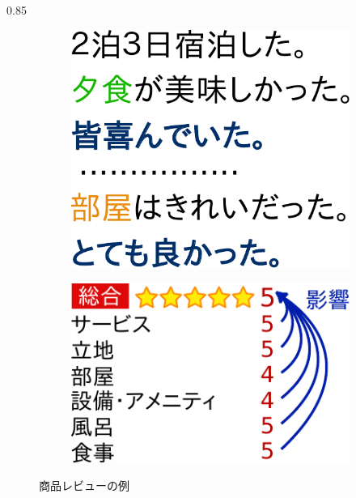 \documentclass[unicode,10pt]{beamer}
\newlength{\mycolumnwidth}
\begin{document}
\begin{frame}[t]
\begin{columns}[onlytextwidth,t]
\begin{column}{0.85\mycolumnwidth}
  \begin{figure}
    \hspace*{\fill} %
    \begin{subfigure}[t]{0.38\linewidth}
      \includegraphics[width=0.9\linewidth]
                      {fig/relations_among_sentences_v3.pdf}
    \end{subfigure}
    \hfill %
    \begin{subfigure}[t]{0.52\linewidth}
      \includegraphics[width=0.9\linewidth]
                      {fig/relations_among_rating_categories.pdf}
    \end{subfigure}
    \hspace*{\fill} %
    \caption*{商品レビューの例}
  \end{figure}


\end{column}
\end{columns}
\end{frame}
\end{document}
